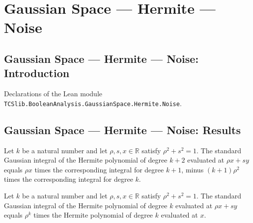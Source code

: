 \section{Gaussian Space --- Hermite --- Noise}
\subsection*{Gaussian Space --- Hermite --- Noise: Introduction}

Declarations of the Lean module \texttt{TCSlib.BooleanAnalysis.GaussianSpace.Hermite.Noise}.

\subsection*{Gaussian Space --- Hermite --- Noise: Results}

\begin{lemma}
\label{BooleanAnalysis.GaussianSpace.integral_hermite_affine_recurrence}
\leanok
{}
Let $k$ be a natural number and let $\rho,s,x\in\mathbb R$ satisfy $\rho^2+s^2=1$. The
standard Gaussian integral of the Hermite polynomial of degree $k+2$ evaluated at $\rho
x+s y$ equals $\rho x$ times the corresponding integral for degree $k+1$, minus
$(k+1)\rho^2$ times the corresponding integral for degree $k$.
\end{lemma}

\begin{lemma}
\label{BooleanAnalysis.GaussianSpace.integral_hermite_affine_standardGaussian}
\leanok
{}
Let $k$ be a natural number and let $\rho,s,x\in\mathbb R$ satisfy $\rho^2+s^2=1$. The
standard Gaussian integral of the Hermite polynomial of degree $k$ evaluated at $\rho
x+s y$ equals $\rho^k$ times the Hermite polynomial of degree $k$ evaluated at $x$.
\end{lemma}

